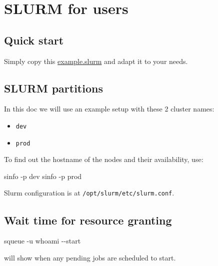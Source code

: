 \documentclass[
]{report}
\author{}
\date{2024-02-13}
\newenvironment{Shaded}{\begin{snugshade}}{\end{snugshade}}
\newcommand{\AttributeTok}[1]{\textcolor[rgb]{0.40,0.45,0.13}{#1}}
\newcommand{\ExtensionTok}[1]{\textcolor[rgb]{0.00,0.23,0.31}{#1}}
\newcommand{\FunctionTok}[1]{\textcolor[rgb]{0.28,0.35,0.67}{#1}}
\newcommand{\KeywordTok}[1]{\textcolor[rgb]{0.00,0.23,0.31}{#1}}
\newcommand{\NormalTok}[1]{\textcolor[rgb]{0.00,0.23,0.31}{#1}}
\providecommand{\tightlist}{%
  \setlength{\itemsep}{0pt}\setlength{\parskip}{0pt}}\usepackage{longtable,booktabs,array}
\begin{document}
\chapter{SLURM for users}\label{slurm-for-users}

\section{Quick start}\label{quick-start}

Simply copy this \href{./example.slurm}{example.slurm} and adapt it to
your needs.

\section{SLURM partitions}\label{slurm-partitions}

In this doc we will use an example setup with these 2 cluster names:

\begin{itemize}
\tightlist
\item
  \texttt{dev}
\item
  \texttt{prod}
\end{itemize}

To find out the hostname of the nodes and their availability, use:

\begin{Shaded}
\begin{Highlighting}[]
\ExtensionTok{sinfo} \AttributeTok{{-}p}\NormalTok{ dev}
\ExtensionTok{sinfo} \AttributeTok{{-}p}\NormalTok{ prod}
\end{Highlighting}
\end{Shaded}

Slurm configuration is at \texttt{/opt/slurm/etc/slurm.conf}.

\section{Wait time for resource
granting}\label{wait-time-for-resource-granting}

\begin{Shaded}
\begin{Highlighting}[]
\ExtensionTok{squeue} \AttributeTok{{-}u} \KeywordTok{\textasciigrave{}}\FunctionTok{whoami}\KeywordTok{\textasciigrave{}} \AttributeTok{{-}{-}start}
\end{Highlighting}
\end{Shaded}

will show when any pending jobs are scheduled to start.
\end{document}
